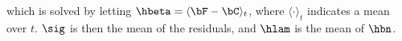 \noindent which is solved by letting $\hbeta=\langle \bF-\bC \rangle_t$, where $\langle \cdot \rangle_t$ indicates a mean over $t$.  $\sig$ is then the mean of the residuals, and $\hlam$ is the mean of $\hbn$. 
% 
% 
% 
% 
% 
% 
% 
% 

